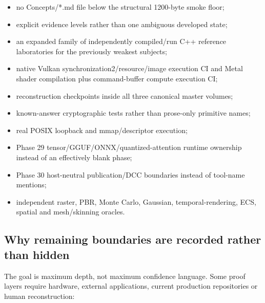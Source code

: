 \begin{itemize}
\tightlist
\item
  no Concepts/*.md file below the structural 1200-byte smoke floor;
\item
  explicit evidence levels rather than one ambiguous developed state;
\item
  an expanded family of independently compiled/run C++ reference laboratories for the previously weakest subjects;
\item
  native Vulkan synchronization2/resource/image execution CI and Metal shader compilation plus command-buffer compute execution CI;
\item
  reconstruction checkpoints inside all three canonical master volumes;
\item
  known-answer cryptographic tests rather than prose-only primitive names;
\item
  real POSIX loopback and mmap/descriptor execution;
\item
  Phase 29 tensor/GGUF/ONNX/quantized-attention runtime ownership instead of an effectively blank phase;
\item
  Phase 30 host-neutral publication/DCC boundaries instead of tool-name mentions;
\item
  independent raster, PBR, Monte Carlo, Gaussian, temporal-rendering, ECS, spatial and mesh/skinning oracles.
\end{itemize}

\subsection{Why remaining boundaries are recorded rather than hidden}\label{appendix-2358b21a702d-why-remaining-boundaries-are-recorded-rather-than-hidden}

\hypertarget{appendix-2358b21a702d-why-remaining-boundaries-are-recorded-rather-than-hidden}{}

The goal is maximum depth, not maximum confidence language. Some proof layers require hardware, external applications, current production repositories or human reconstruction:


